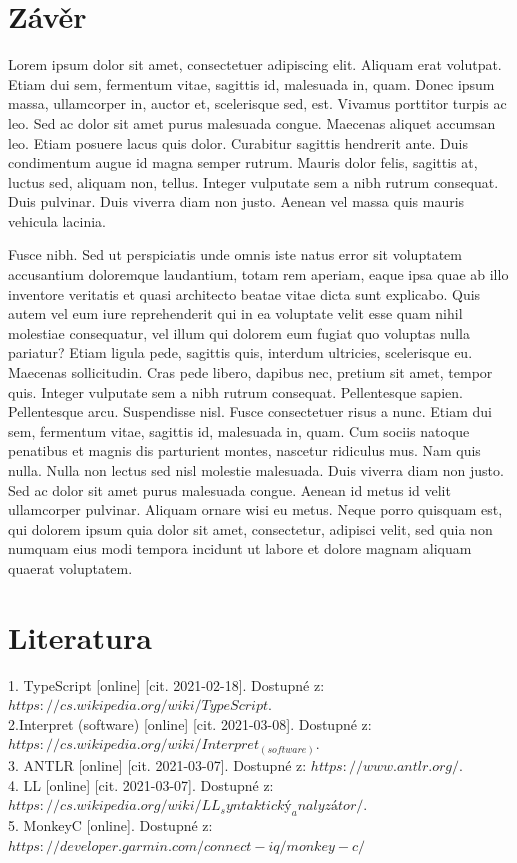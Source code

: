 \documentclass[czech,master,dept460,male,cpp,cpdeclaration]{diploma}
\begin{document}
\section{Závěr}
Lorem ipsum dolor sit amet, consectetuer adipiscing elit. Aliquam erat volutpat. Etiam dui sem, fermentum vitae, sagittis id, malesuada in, quam. Donec ipsum massa, ullamcorper in, auctor et, scelerisque sed, est. Vivamus porttitor turpis ac leo. Sed ac dolor sit amet purus malesuada congue. Maecenas aliquet accumsan leo. Etiam posuere lacus quis dolor. Curabitur sagittis hendrerit ante. Duis condimentum augue id magna semper rutrum. Mauris dolor felis, sagittis at, luctus sed, aliquam non, tellus. Integer vulputate sem a nibh rutrum consequat. Duis pulvinar. Duis viverra diam non justo. Aenean vel massa quis mauris vehicula lacinia.

Fusce nibh. Sed ut perspiciatis unde omnis iste natus error sit voluptatem accusantium doloremque laudantium, totam rem aperiam, eaque ipsa quae ab illo inventore veritatis et quasi architecto beatae vitae dicta sunt explicabo. Quis autem vel eum iure reprehenderit qui in ea voluptate velit esse quam nihil molestiae consequatur, vel illum qui dolorem eum fugiat quo voluptas nulla pariatur? Etiam ligula pede, sagittis quis, interdum ultricies, scelerisque eu. Maecenas sollicitudin. Cras pede libero, dapibus nec, pretium sit amet, tempor quis. Integer vulputate sem a nibh rutrum consequat. Pellentesque sapien. Pellentesque arcu. Suspendisse nisl. Fusce consectetuer risus a nunc. Etiam dui sem, fermentum vitae, sagittis id, malesuada in, quam. Cum sociis natoque penatibus et magnis dis parturient montes, nascetur ridiculus mus. Nam quis nulla. Nulla non lectus sed nisl molestie malesuada. Duis viverra diam non justo. Sed ac dolor sit amet purus malesuada congue. Aenean id metus id velit ullamcorper pulvinar. Aliquam ornare wisi eu metus. Neque porro quisquam est, qui dolorem ipsum quia dolor sit amet, consectetur, adipisci velit, sed quia non numquam eius modi tempora incidunt ut labore et dolore magnam aliquam quaerat voluptatem.

\section{Literatura}
1. TypeScript [online] [cit. 2021-02-18]. Dostupné z: $https://cs.wikipedia.org/wiki/TypeScript$.\\
2.Interpret (software) [online] [cit. 2021-03-08]. Dostupné z: $https://cs.wikipedia.org/wiki/Interpret_(software)$.\\
3. ANTLR [online] [cit. 2021-03-07]. Dostupné z: $https://www.antlr.org/$.\\
4. LL [online] [cit. 2021-03-07]. Dostupné z: $https://cs.wikipedia.org/wiki/LL_syntaktický_analyzátor/$.\\
5. MonkeyC [online]. Dostupné z: $https://developer.garmin.com/connect-iq/monkey-c/$



\printbibliography[title={Literatura}, heading=bibintoc]
\end{document}

